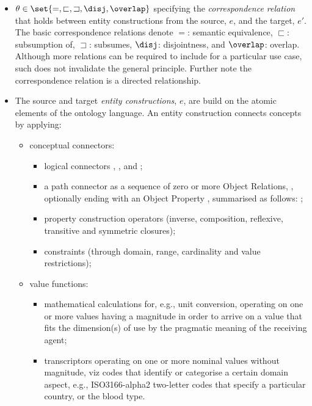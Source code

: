 \documentclass[sort&compress,preprint,authoryear,3p,twocolumn]{elsarticle}
\providecommand{\tightlist}{%
  \setlength{\itemsep}{0pt}\setlength{\parskip}{0pt}}
\begin{document}
\begin{itemize}
\tightlist
\item
  \(\theta \in \set{=, \sqsubset, \sqsupset, \disj, \overlap }\)
  specifying the \emph{correspondence relation} that holds between
  entity constructions from the source, \(e\), and the target, \(e'\).
  The basic correspondence relations denote \(=\): semantic equivalence,
  \(\sqsubset\): subsumption of, \(\sqsupset\): subsumes, \(\disj\):
  disjointness, and \(\overlap\): overlap. Although more relations can
  be required to include for a particular use case, such does not
  invalidate the general principle. Further note the correspondence
  relation is a directed relationship.
\item
  The source and target \emph{entity constructions}, \(e\), are build on
  the atomic elements of the ontology language. An entity construction
  connects concepts by applying:

  \begin{itemize}
  \tightlist
  \item
    conceptual connectors:

    \begin{itemize}
    \tightlist
    \item
      logical connectors , , and ;
    \item
      a path connector as a sequence of zero or more Object Relations,
      , optionally ending with an Object Property ,
      summarised as follows: ;
    \item
      property construction operators (inverse, composition, reflexive,
      transitive and symmetric closures);
    \item
      constraints (through domain, range, cardinality and value
      restrictions);
    \end{itemize}
  \item
    value functions:

    \begin{itemize}
    \tightlist
    \item
      mathematical calculations for, e.g., unit conversion, operating on
      one or more values having a magnitude in order to arrive on a
      value that fits the dimension(s) of use by the pragmatic meaning
      of the receiving agent;
    \item
      transcriptors operating on one or more nominal values without
      magnitude, viz codes that identify or categorise a certain domain
      aspect, e.g., ISO3166-alpha2 two-letter codes that specify a
      particular country, or the blood type.
    \end{itemize}
  \end{itemize}
\end{itemize}
\end{document}
